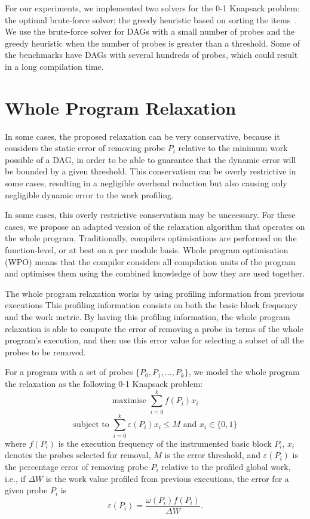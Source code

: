For our experiments, we implemented two solvers for the 0-1 Knapsack problem:
the optimal brute-force solver;
the greedy heuristic based on sorting the items~\citep{dantzig57}.
We use the brute-force solver for DAGs with a small number of probes and the greedy heuristic when the number of probes is greater than a threshold.
Some of the benchmarks have DAGs with several hundreds of probes, which could result in a long compilation time.

\section{Whole Program Relaxation}

In some cases, the proposed relaxation can be very conservative, because it considers the static error of removing probe $P_i$ relative to the minimum work possible of a DAG, in order to be able to guarantee that the dynamic error will be bounded by a given threshold.
This conservatism can be overly restrictive in some cases, resulting in a negligible overhead reduction but also causing only negligible dynamic error to the work profiling.

In some cases, this overly restrictive conservatism may be unecessary.
For these cases, we propose an adapted version of the relaxation algorithm that operates on the whole program.
Traditionally, compilers optimisations are performed on the function-level, or at best on a per module basis.
Whole program optimisation (WPO) means that the compiler considers all compilation units of the program and optimises them using the combined knowledge of how they are used together.

The whole program relaxation works by using profiling information from previous executions
This profiling information consists on both the basic block frequency and the work metric.
By having this profiling information, the whole program relaxation is able to compute the error of removing a probe in terms of the whole program's execution,
and then use this error value for selecting a subset of all the probes to be removed.

For a program with a set of probes $\{P_0, P_1, \ldots, P_k\}$, we model the whole program the relaxation as the following 0-1 Knapsack problem:
\[
\textrm{maximise } \sum_{i=0}^{k} f(P_i)x_i
\]
\[
\textrm{subject to } \sum_{i=0}^{k} \varepsilon(P_i)x_i \leq M \textrm{ and } x_i\in\{0,1\}
\]
where $f(P_i)$ is the execution frequency of the instrumented basic block $P_i$, $x_i$ denotes the probes selected for removal, $M$ is the error threshold, and $\varepsilon(P_i)$ is the percentage error of removing probe $P_i$ relative to the profiled global work, i.e.,
if $\Delta W$ is the work value profiled from previous executions, the error for a given probe $P_i$ is
\[
\varepsilon(P_i) = \frac{\omega(P_i)f(P_i)}{\Delta W}.
\]

